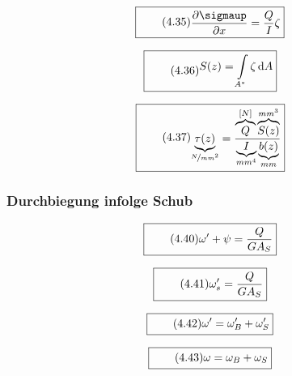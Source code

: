 \documentclass[11pt]{article}
\newcommand{\1}{ {\mathds{1}} }
\newcommand{\td}{\,\text{d}}
\renewcommand{\sigma  }{\sigmaup   }
\begin{document}
		\begin{equation}
			\boxed{
				\tag{4.35}
				\begin{split}
					\frac{\partial \sigma}{\partial x} = \frac{Q}{I} \zeta
				\end{split}
			}
		\end{equation}

		\begin{equation}
			\boxed{
				\tag{4.36}
				\begin{split}
					S(z) = \int\limits_{A^*} \zeta \td A
				\end{split}
			}
		\end{equation}

		\begin{equation}
			\boxed{
				\tag{4.37}
				\begin{split}
					\underbrace{\tau(z)}_{\nicefrac{N}{mm^2}} = \frac{\overbrace{Q}^{[N]}\overbrace{S(z)}^{mm^3}}{\underbrace{I}_{mm^4}\underbrace{b(z)}_{mm}}
				\end{split}
			}
		\end{equation}
		
		\subsubsection{Durchbiegung infolge Schub}

		\begin{equation}
			\boxed{
				\tag{4.40}
				\begin{split}
					\omega' + \psi = \frac{Q}{GA_S}
				\end{split}
			}
		\end{equation}

		\begin{equation}
			\boxed{
				\tag{4.41}
				\begin{split}
					\omega_s' = \frac{Q}{GA_S}
				\end{split}
			}
		\end{equation}

		\begin{equation}
			\boxed{
				\tag{4.42}
				\begin{split}
					\omega' = \omega_B' + \omega_S'
				\end{split}
			}
		\end{equation}

		\begin{equation}
			\boxed{
				\tag{4.43}
				\begin{split}
					\omega = \omega_B + \omega_S
				\end{split}
			}
		\end{equation}
		
\end{document}
